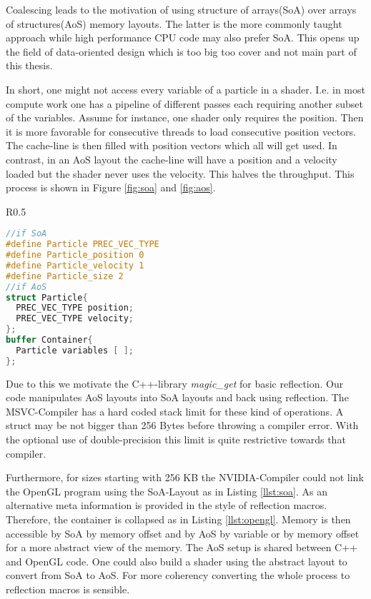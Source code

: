 \documentclass[m,times]{cgMA}
\begin{document}
Coalescing leads to the motivation of using structure of arrays(SoA) over arrays of structures(AoS) memory layouts. The latter is the more commonly taught approach while high performance CPU code may also prefer SoA. This opens up the field of data-oriented design which is too big too cover and not main part of this thesis.

In short, one might not access every variable of a particle in a shader. I.e. in most compute work one has a pipeline of different passes each requiring another subset of the variables. Assume for instance, one shader only requires the position. Then it is more favorable for consecutive threads to load consecutive position vectors. The cache-line is then filled with position vectors which all will get used. In contrast, in an AoS layout the cache-line will have a position and a velocity loaded but the shader never uses the velocity. This halves the throughput. This process is shown in Figure \ref{fig:soa} and \ref{fig:aos}.

\noindent\begin{wrapfigure}{R}{0.5\textwidth}
\hfill\begin{minipage}{0.45\textwidth}
\begin{lstlisting}[caption={OpenGL Layout},label={llst:opengl},language={GLSL},style={GL}]
//if SoA
#define Particle PREC_VEC_TYPE
#define Particle_position 0
#define Particle_velocity 1
#define Particle_size 2
//if AoS
struct Particle{
  PREC_VEC_TYPE position;
  PREC_VEC_TYPE velocity;
};
buffer Container{
  Particle variables [ ];
};
\end{lstlisting}
\end{minipage}
\end{wrapfigure}

Due to this we motivate the C++-library \textit{magic\_get} \cite{APOLUKHIN:MAGIC_GET} for basic reflection. Our code manipulates AoS layouts into SoA layouts and back using reflection. The MSVC-Compiler has a hard coded stack limit for these kind of operations. A struct may be not bigger than 256 Bytes before throwing a compiler error. With the optional use of double-precision this limit is quite restrictive towards that compiler.

Furthermore, for sizes starting with 256 KB the NVIDIA-Compiler could not link the OpenGL program using the SoA-Layout as in Listing \ref{llst:soa}. As an alternative meta information is provided in the style of reflection macros. Therefore, the container is collapsed as in Listing \ref{llst:opengl}. Memory is then accessible by SoA by memory offset and by AoS by variable or by memory offset for a more abstract view of the memory. The AoS setup is shared between C++ and OpenGL code. One could also build a shader using the abstract layout to convert from SoA to AoS. For more coherency converting the whole process to reflection macros is sensible.
\end{document}
